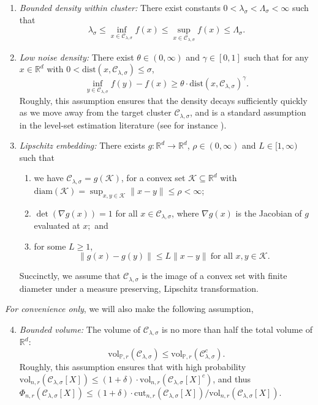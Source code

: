 \documentclass[11pt,twoside]{article}
\newcommand{\Reals}{\mathbb{R}}
\newcommand{\1}{\mathbf{1}}
\newcommand{\Rd}{\Reals^d}
\newcommand{\mc}[1]{\mathcal{#1}}
\newcommand{\Pbb}{\mathbb{P}}
\newcommand{\dist}{\mathrm{dist}}
\newcommand{\vol}{\mathrm{vol}}
\newcommand{\cut}{\mathrm{cut}}
\begin{document}
\begin{enumerate}[label=(A\arabic*)]
	\item
	\label{asmp:bounded_density}
	\emph{Bounded density within cluster:} There exist constants
	$0<\lambda_{\sigma}< \Lambda_{\sigma}<\infty$ such that 
	$$
	\lambda_{\sigma} \leq \inf_{x \in \mc{C}_{\lambda,\sigma}} f(x) \leq \sup_{x \in \mc{C}_{\lambda,\sigma}} f(x)
	\leq \Lambda_{\sigma}.
	$$
	
	\item 
	\label{asmp:low_noise_density}
	\emph{Low noise density:} There exist $\theta \in (0,\infty)$ and $\gamma \in
	[0,1]$ such that for any $x \in \Rd$ with $0 < \dist(x, \mc{C}_{\lambda,\sigma}) \leq \sigma$,     
	$$
	\inf_{y \in \mc{C}_{\lambda,\sigma}} f(y) - f(x) \geq  \theta \cdot \dist(x, \mc{C}_{\lambda,\sigma})^{\gamma}.  
	$$
	Roughly, this assumption ensures that the density decays sufficiently quickly
	as we move away from the target cluster $\mc{C}_{\lambda,\sigma}$, and is a standard assumption
	in the level-set estimation literature (see for instance \citet{singh2009}).
	
	\item
	\label{asmp:embedding}
	\emph{Lipschitz embedding:}
	There exists $g: \Reals^d \to \Reals^d$, $\rho \in (0,\infty)$ and $L \in [1,\infty)$ such that
	\begin{enumerate}
		\item we have $\mc{C}_{\lambda,\sigma} = g(\mathcal{K})$, for a convex set $\mathcal{K}
		\subseteq \Rd$ with $\mathrm{diam}(\mathcal{K}) = \sup_{x,y \in
			\mathcal{K}}\|x - y\| \leq \rho < \infty$;
		\item $\det(\nabla g (x)) = 1$ for all $x \in \mc{C}_{\lambda,\sigma}$, where $\nabla g(x)$ is
		the Jacobian of $g$ evaluated at $x;$ and 
		\item for some $L \geq 1$,   
		$$
		\|g(x) - g(y)\| \leq L \|x - y\| ~
		\text{for all $x,y \in \mathcal{K}$}. 
		$$
	\end{enumerate}
	Succinctly, we assume that $\mc{C}_{\lambda,\sigma}$ is the image of a convex set with finite
	diameter under a measure preserving, Lipschitz transformation. 
\end{enumerate}

\emph{For convenience only}, we will also make the following assumption, 
\begin{enumerate}[label=(A\arabic*)]
	\setcounter{enumi}{3}
	\item
	\label{asmp:bounded_volume}
	\emph{Bounded volume:}
	The volume of $\mc{C}_{\lambda,\sigma}$ is no more than half the total volume of $\Rd$:
	$$
	\vol_{\Pbb,r}(\mc{C}_{\lambda,\sigma}) \leq \vol_{\Pbb,r}(\mc{C}_{\lambda,\sigma}^c). 
	$$
	Roughly, this assumption ensures that with high probability $\vol_{n,r}(\mc{C}_{\lambda,\sigma}[X]) \leq (1 + \delta) \cdot \vol_{n,r}(\mc{C}_{\lambda,\sigma}[X]^c)$, and thus $\Phi_{n,r}(\mc{C}_{\lambda,\sigma}[X]) \leq (1 + \delta) \cdot \cut_{n,r}(\mc{C}_{\lambda,\sigma}[X])/\vol_{n,r}(\mc{C}_{\lambda,\sigma}[X])$. 
\end{enumerate}
\end{document}
